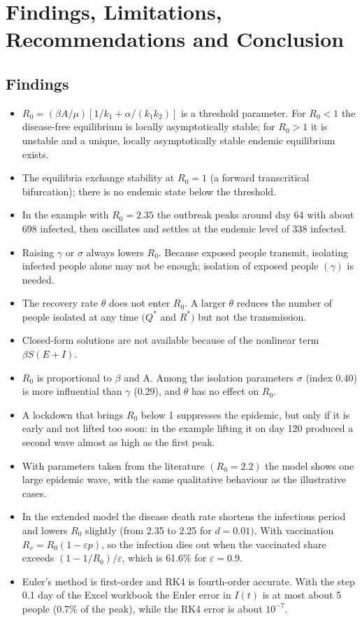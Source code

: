 \documentclass[12pt,a4paper]{article}
\theoremstyle{definition}
\begin{document}
\section{Findings, Limitations, Recommendations and Conclusion}

\subsection{Findings}

\begin{itemize}
\item $R_{0} = (\beta A/\mu )[1/k_{1} + \alpha /(k_{1}k_{2})]$ is a threshold parameter. For $R_{0} < 1$ the disease-free equilibrium is locally asymptotically stable; for $R_{0} > 1$ it is unstable and a unique, locally asymptotically stable endemic equilibrium exists.
\item The equilibria exchange stability at $R_{0} = 1$ (a forward transcritical bifurcation); there is no endemic state below the threshold.
\item In the example with $R_{0} = 2.35$ the outbreak peaks around day 64 with about 698 infected, then oscillates and settles at the endemic level of 338 infected.
\item Raising $\gamma$ or $\sigma$ always lowers $R_{0}$. Because exposed people transmit, isolating infected people alone may not be enough; isolation of exposed people $(\gamma )$ is needed.
\item The recovery rate $\theta$ does not enter $R_{0}$. A larger $\theta$ reduces the number of people isolated at any time $(Q^*$ and $R^*)$ but not the transmission.
\item Closed-form solutions are not available because of the nonlinear term $\beta S(E + I)$.
\item $R_{0}$ is proportional to $\beta$ and A. Among the isolation parameters $\sigma$ (index \textminus{}0.40) is more influential than $\gamma$ (\textminus{}0.29), and $\theta$ has no effect on $R_{0}$.
\item A lockdown that brings $R_{0}$ below 1 suppresses the epidemic, but only if it is early and not lifted too soon: in the example lifting it on day 120 produced a second wave almost as high as the first peak.
\item With parameters taken from the literature $(R_{0} = 2.2)$ the model shows one large epidemic wave, with the same qualitative behaviour as the illustrative cases.
\item In the extended model the disease death rate shortens the infectious period and lowers $R_{0}$ slightly (from 2.35 to 2.25 for $d = 0.01)$. With vaccination $R_{v} = R_{0}(1 - \varepsilon p)$, so the infection dies out when the vaccinated share exceeds $(1 - 1/R_{0})/\varepsilon$, which is 61.6\% for $\varepsilon = 0.9$.
\item Euler's method is first-order and RK4 is fourth-order accurate. With the step 0.1 day of the Excel workbook the Euler error in $I(t)$ is at most about 5 people (0.7\% of the peak), while the RK4 error is about $10^{-7}$.
\end{itemize}
\end{document}

